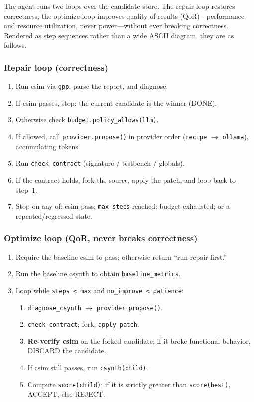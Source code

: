 The agent runs two loops over the candidate store. The repair loop
restores correctness; the optimize loop improves quality of results (QoR)---performance and resource utilization, never power---without ever breaking correctness. Rendered as step
sequences rather than a wide ASCII diagram, they are as follows.

\subsubsection{Repair loop (correctness)}
\begin{enumerate}
  \item Run csim via \texttt{gpp}, parse the report, and diagnose.
  \item If csim passes, stop: the current candidate is the winner
    (DONE).
  \item Otherwise check \texttt{budget.policy\_allows(llm)}.
  \item If allowed, call \texttt{provider.propose()} in provider order
    (\texttt{recipe} $\rightarrow$ \texttt{ollama}), accumulating
    tokens.
  \item Run \texttt{check\_contract} (signature / testbench / globals).
  \item If the contract holds, fork the source, apply the patch, and
    loop back to step~1.
  \item Stop on any of: csim pass; \texttt{max\_steps} reached; budget
    exhausted; or a repeated/regressed state.
\end{enumerate}

\subsubsection{Optimize loop (QoR, never breaks correctness)}
\begin{enumerate}
  \item Require the baseline csim to pass; otherwise return ``run repair
    first.''
  \item Run the baseline csynth to obtain \texttt{baseline\_metrics}.
  \item Loop while \texttt{steps < max} and
    \texttt{no\_improve < patience}:
  \begin{enumerate}
    \item \texttt{diagnose\_csynth} $\rightarrow$
      \texttt{provider.propose()}.
    \item \texttt{check\_contract}; fork; \texttt{apply\_patch}.
    \item \textbf{Re-verify csim} on the forked candidate; if it broke
      functional behavior, DISCARD the candidate.
    \item If csim still passes, run \texttt{csynth(child)}.
    \item Compute \texttt{score(child)}; if it is strictly greater than
      \texttt{score(best)}, ACCEPT, else REJECT.
  \end{enumerate}
\end{enumerate}

